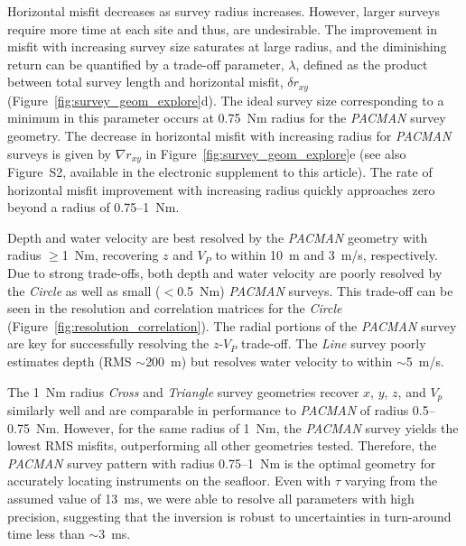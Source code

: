 Horizontal misfit decreases as survey radius increases. However, larger surveys require more time at each site and thus, are undesirable. The improvement in misfit with increasing survey size saturates at large radius, and the diminishing return can be quantified by a trade-off parameter, $\lambda$, defined as the product between total survey length and horizontal misfit, $\delta r_{xy}$ (Figure~\ref{fig:survey_geom_explore}d). The ideal survey size corresponding to a minimum in this parameter occurs at 0.75~Nm radius for the \textit{PACMAN} survey geometry. The decrease in horizontal misfit with increasing radius for \textit{PACMAN} surveys is given by $\nabla r_{xy}$ in Figure~\ref{fig:survey_geom_explore}e (see also Figure~S2, available in the electronic supplement to this article). The rate of horizontal misfit improvement with increasing radius quickly approaches zero beyond a radius of 0.75--1~Nm.

Depth and water velocity are best resolved by the \textit{PACMAN} geometry with radius $\geq$1~Nm, recovering $z$ and $V_{P}$ to within 10~m and 3~m/s, respectively. Due to strong trade-offs, both depth and water velocity are poorly resolved by the \textit{Circle} as well as small ($<$0.5~Nm) \textit{PACMAN} surveys. This trade-off can be seen in the resolution and correlation matrices for the \textit{Circle} (Figure~\ref{fig:resolution_correlation}). The radial portions of the \textit{PACMAN} survey are key for successfully resolving the $z$-$V_P$ trade-off. The \textit{Line} survey poorly estimates depth (RMS $\sim$200~m) but resolves water velocity to within $\sim$5~m/s.

The 1~Nm radius \textit{Cross} and \textit{Triangle} survey geometries recover $x$, $y$, $z$, and $V_{p}$ similarly well and are comparable in performance to \textit{PACMAN} of radius 0.5--0.75~Nm. However, for the same radius of 1~Nm, the \textit{PACMAN} survey yields the lowest RMS misfits, outperforming all other geometries tested. Therefore, the \textit{PACMAN} survey pattern with radius 0.75--1~Nm is the optimal geometry for accurately locating instruments on the seafloor. Even with $\tau$ varying from the assumed value of 13~ms, we were able to resolve all parameters with high precision, suggesting that the inversion is robust to uncertainties in turn-around time less than $\sim$3~ms.

